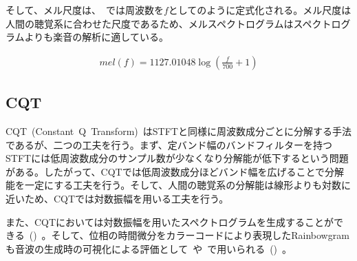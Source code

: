 そして、メル尺度は、~\cite{mel}では周波数を$f$としてのように定式化される。メル尺度は人間の聴覚系に合わせた尺度であるため、メルスペクトログラムはスペクトログラムよりも楽音の解析に適している。

\begin{align}
    \label{eq:mel}
    mel(f)=1127.01048\log{(\frac{f}{700}+1)}
\end{align}

\subsection{CQT}

CQT~(Constant~Q~Transform)~\cite{CQT}はSTFTと同様に周波数成分ごとに分解する手法であるが、二つの工夫を行う。まず、定バンド幅のバンドフィルターを持つSTFTには低周波数成分のサンプル数が少なくなり分解能が低下するという問題がある。したがって、CQTでは低周波数成分ほどバンド幅を広げることで分解能を一定にする工夫を行う。そして、人間の聴覚系の分解能は線形よりも対数に近いため、CQTでは対数振幅を用いる工夫を行う。

また、CQTにおいては対数振幅を用いたスペクトログラムを生成することができる~()~。そして、位相の時間微分をカラーコードにより表現したRainbowgramも音波の生成時の可視化による評価として~\cite{NSynth}や~\cite{GANSynth}で用いられる~()~。


